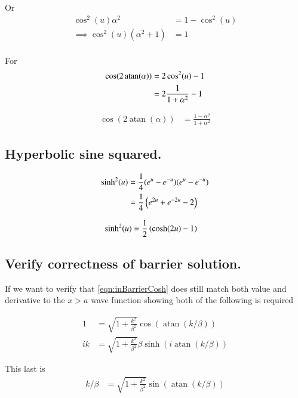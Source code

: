 \documentclass{article}
\DeclareMathOperator{\atan}{atan}
\begin{document}
Or
\begin{align*}
\cos^2(u) \alpha^2 &= 1 - \cos^2(u) \\
\implies
\cos^2(u) (\alpha^2 +1 ) &= 1 \\
\end{align*}

For 
\begin{align*}
\cos(2\atan(\alpha)) 
&= 
2 \cos^2( u ) -1 \\
&= 
2 \inv{1 + \alpha^2} -1 \\
\end{align*}

\begin{align}\label{eqn:cosineTwiceArcTan}
\cos(2\atan(\alpha)) 
&= 
\frac{1 - \alpha^2}{1 + \alpha^2}
\end{align}

\subsection{ Hyperbolic sine squared. }

\begin{align*}
\sinh^2(u) 
&=
\frac{1}{4} (e^u - e^{-u}) (e^u - e^{-u}) \\
&=
\frac{1}{4} \left(e^{2u} + e^{-2u} -2 \right) \\
\end{align*}

\begin{align}\label{eqn:sinhSquared}
\sinh^2(u) 
&=
\frac{1}{2} \left( \cosh(2u) -1 \right) 
\end{align}

\subsection{ Verify correctness of barrier solution. }

If we want to verify that \ref{eqn:inBarrierCosh} 
does still match both value and derivative to the $x>a$ wave function
showing both of the following is required

\begin{align*}
1 &= \sqrt{1 + \frac{k^2}{\beta^2}} \cos\left( \atan(k/\beta) \right) \\
ik &=
\sqrt{1 + \frac{k^2}{\beta^2}} \beta \sinh\left( i \atan(k/\beta) \right)
\end{align*}

This last is
\begin{align*}
k/\beta &=
\sqrt{1 + \frac{k^2}{\beta^2}} \sin\left( \atan(k/\beta) \right)
\end{align*}
\end{document}
